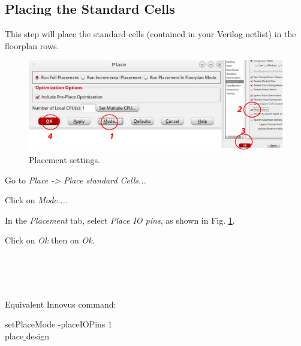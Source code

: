 \subsection{Placing the Standard Cells}
This step will place the standard cells (contained in your Verilog netlist) in the floorplan rows.
\begin{enumerate}
	\parbox[t]{\dimexpr\textwidth-\leftmargin}{%
		\begin{figure}
			\vspace{-14mm}
			\centering
			\vspace{-\baselineskip}
	\includegraphics[scale=0.4]{figures/lab5_backend/place.pdf}
\caption{Placement settings.}
\label{fig_place}
		\end{figure}
\item Go to \textit{Place -> Place standard Cells...}
\item Click on \textit{Mode...}.
\item In the \textit{Placement} tab, select \textit{Place IO pins}, as shown in Fig. \ref{fig_place}.
\item Click on \textit{Ok} then on \textit{Ok}.
	} \\ \\ \\ 
\end{enumerate}

Equivalent Innovus command:
\begin{codeline}
setPlaceMode -placeIOPins 1 \\
place$\_$design
\end{codeline}




